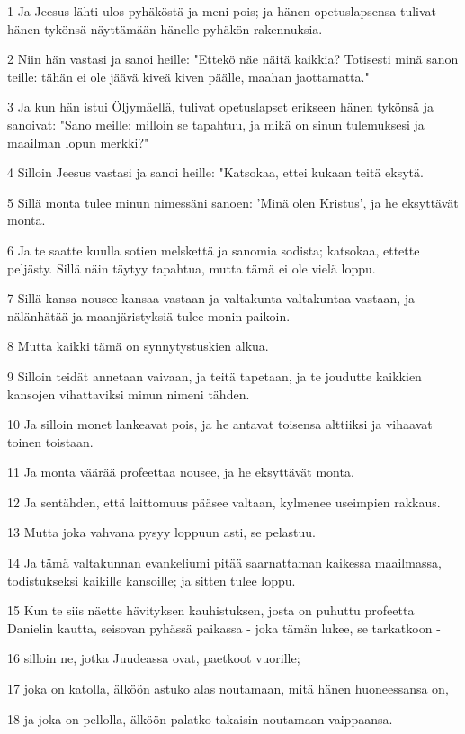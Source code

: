 \par 1 Ja Jeesus lähti ulos pyhäköstä ja meni pois; ja hänen opetuslapsensa tulivat hänen tykönsä näyttämään hänelle pyhäkön rakennuksia.
\par 2 Niin hän vastasi ja sanoi heille: "Ettekö näe näitä kaikkia? Totisesti minä sanon teille: tähän ei ole jäävä kiveä kiven päälle, maahan jaottamatta."
\par 3 Ja kun hän istui Öljymäellä, tulivat opetuslapset erikseen hänen tykönsä ja sanoivat: "Sano meille: milloin se tapahtuu, ja mikä on sinun tulemuksesi ja maailman lopun merkki?"
\par 4 Silloin Jeesus vastasi ja sanoi heille: "Katsokaa, ettei kukaan teitä eksytä.
\par 5 Sillä monta tulee minun nimessäni sanoen: 'Minä olen Kristus', ja he eksyttävät monta.
\par 6 Ja te saatte kuulla sotien melskettä ja sanomia sodista; katsokaa, ettette peljästy. Sillä näin täytyy tapahtua, mutta tämä ei ole vielä loppu.
\par 7 Sillä kansa nousee kansaa vastaan ja valtakunta valtakuntaa vastaan, ja nälänhätää ja maanjäristyksiä tulee monin paikoin.
\par 8 Mutta kaikki tämä on synnytystuskien alkua.
\par 9 Silloin teidät annetaan vaivaan, ja teitä tapetaan, ja te joudutte kaikkien kansojen vihattaviksi minun nimeni tähden.
\par 10 Ja silloin monet lankeavat pois, ja he antavat toisensa alttiiksi ja vihaavat toinen toistaan.
\par 11 Ja monta väärää profeettaa nousee, ja he eksyttävät monta.
\par 12 Ja sentähden, että laittomuus pääsee valtaan, kylmenee useimpien rakkaus.
\par 13 Mutta joka vahvana pysyy loppuun asti, se pelastuu.
\par 14 Ja tämä valtakunnan evankeliumi pitää saarnattaman kaikessa maailmassa, todistukseksi kaikille kansoille; ja sitten tulee loppu.
\par 15 Kun te siis näette hävityksen kauhistuksen, josta on puhuttu profeetta Danielin kautta, seisovan pyhässä paikassa - joka tämän lukee, se tarkatkoon -
\par 16 silloin ne, jotka Juudeassa ovat, paetkoot vuorille;
\par 17 joka on katolla, älköön astuko alas noutamaan, mitä hänen huoneessansa on,
\par 18 ja joka on pellolla, älköön palatko takaisin noutamaan vaippaansa.
